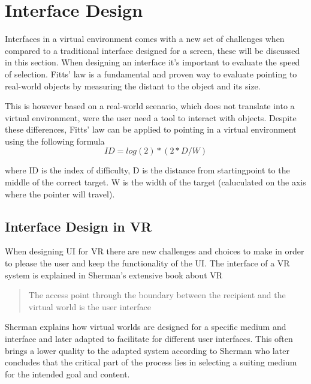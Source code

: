 \section{Interface Design}
Interfaces in a virtual environment comes with a new set of challenges when compared to a traditional interface designed for a screen, these will be discussed in this section.
When designing an interface it's important to evaluate the speed of selection. Fitts' law is a fundamental and proven way to evaluate pointing to real-world objects by measuring the distant to the object and its size\cite{interface:Fitts1954}.

This is however based on a real-world scenario, which does not translate into a virtual environment, were the user need a tool to interact with objects. Despite these differences, Fitts' law can be applied to pointing in a virtual environment using the following formula  \cite{interface:card1978evaluation}
\begin{equation}
ID = log(2) * ( 2 * D / W )
\end{equation}

where ID is the index of difficulty, D is the distance from startingpoint to the middle of the correct target. W is the width of the target (caluculated on the axis where the pointer will travel).

\subsection{Interface Design in VR}
When designing UI for VR there are new challenges and choices to make in order to please the user and keep the functionality of the UI. The interface of a VR system is explained in Sherman's extensive book about VR\cite{interface:sherman2002understanding}
 \begin{quote}
   The access point through the boundary between the recipient and the virtual world is the user interface
 \end{quote}
 Sherman explains how virtual worlds are designed for a specific medium and interface and later adapted to facilitate for different user interfaces. This often brings a lower quality to the adapted system according to Sherman who later concludes that the critical part of the process lies in selecting a suiting medium for the intended goal and content\cite{interface:sherman2002understanding}.

